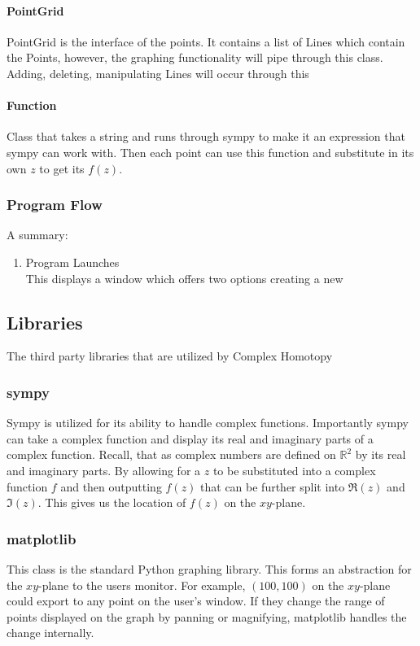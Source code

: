 \documentclass{article}
\begin{document}
            \paragraph{PointGrid}
            PointGrid is the interface of the points. It contains a list of Lines which contain the Points, however, the graphing functionality will pipe through this class. Adding, deleting, manipulating Lines will occur through this
            \paragraph{Function}
            Class that takes a string and runs through sympy to make it an expression that sympy can work with. Then each point can use this function and substitute in its own $z$ to get its $f(z)$.
        \subsubsection{Program Flow}
        A summary:
        \begin{enumerate}
            \item Program Launches\\
                This displays a window which offers two options creating a new 
        \end{enumerate}
    \subsection{Libraries}
    The third party libraries that are utilized by Complex Homotopy
        \subsubsection{sympy}
        Sympy is utilized for its ability to handle complex functions. Importantly sympy can take a complex function and display its real and imaginary parts of a complex function. Recall, that as complex numbers are defined on $\mathbb{R}^2$ by its real and imaginary parts. By allowing for a $z$ to be substituted into a complex function $f$ and then outputting $f(z)$ that can be further split into $\mathfrak{R}(z)$ and $\mathfrak{I}(z)$. This gives us the location of $f(z)$ on the $xy$-plane.
        \subsubsection{matplotlib}
        This class is the standard Python graphing library. This forms an abstraction for the $xy$-plane to the users monitor. For example, $(100,100)$ on the $xy$-plane could export to any point on the user's window. If they change the range of points displayed on the graph by panning or magnifying, matplotlib handles the change internally.
\end{document}
